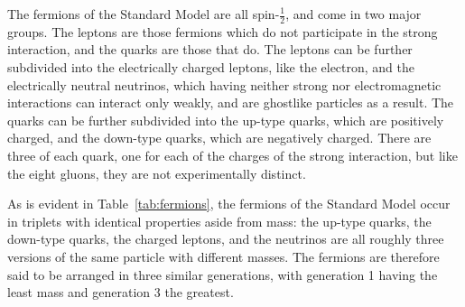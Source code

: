   The fermions of the Standard Model are all spin-$\frac{1}{2}$, and come in two major groups.
  The leptons are those fermions which do not participate in the strong interaction, and the quarks are those that do.
  The leptons can be further subdivided into the electrically charged leptons, like the electron, and the electrically neutral neutrinos, which having neither strong nor electromagnetic interactions can interact only weakly, and are ghostlike particles as a result.
  The quarks can be further subdivided into the up-type quarks, which are positively charged, and the down-type quarks, which are negatively charged.
  There are three of each quark, one for each of the charges of the strong interaction, but like the eight gluons, they are not experimentally distinct.

  As is evident in Table~\ref{tab:fermions}, the fermions of the Standard Model occur in triplets with identical properties aside from mass: the up-type quarks, the down-type quarks, the charged leptons, and the neutrinos are all roughly three versions of the same particle with different masses.
  The fermions are therefore said to be arranged in three similar generations, with generation 1 having the least mass and generation 3 the greatest.

